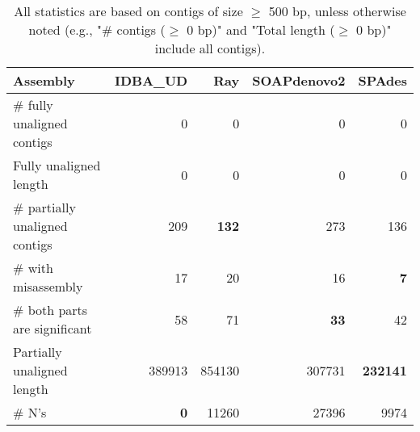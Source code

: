 \documentclass[12pt,a4paper]{article}
\begin{document}
\begin{table}[ht]
\begin{center}
\caption{All statistics are based on contigs of size $\geq$ 500 bp, unless otherwise noted (e.g., "\# contigs ($\geq$ 0 bp)" and "Total length ($\geq$ 0 bp)" include all contigs).}
\begin{tabular}{|l*{4}{|r}|}
\hline
Assembly & IDBA\_UD & Ray & SOAPdenovo2 & SPAdes \\ \hline
\# fully unaligned contigs & 0 & 0 & 0 & 0 \\ \hline
Fully unaligned length & 0 & 0 & 0 & 0 \\ \hline
\# partially unaligned contigs & 209 & {\bf 132} & 273 & 136 \\ \hline
\hspace{5mm}\# with misassembly & 17 & 20 & 16 & {\bf 7} \\ \hline
\hspace{5mm}\# both parts are significant & 58 & 71 & {\bf 33} & 42 \\ \hline
Partially unaligned length & 389913 & 854130 & 307731 & {\bf 232141} \\ \hline
\# N's & {\bf 0} & 11260 & 27396 & 9974 \\ \hline
\end{tabular}
\end{center}
\end{table}
\end{document}
